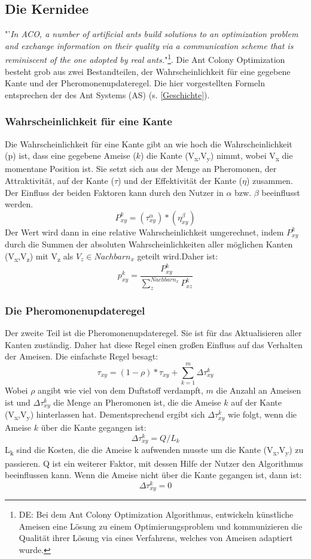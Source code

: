 \documentclass[12pt]{article}
\begin{document}
\subsection{Die Kernidee}\label{Kernidee}
"'\textit{In ACO, a number of artificial ants build solutions to an optimization problem and exchange information on their quality via a communication scheme that is reminiscent of the one adopted by real ants.}"\cite{ dorigo2007ant}\footnote{DE: Bei dem Ant Colony Optimization Algorithmus, entwickeln künstliche Ameisen eine Lösung zu einem Optimierungsproblem und kommunizieren die Qualität ihrer Lösung via eines Verfahrens, welches von Ameisen adaptiert wurde.  }. 
Die Ant Colony Optimization besteht grob aus zwei Bestandteilen, der Wahrscheinlichkeit für eine gegebene Kante und der Pheromonenupdateregel. Die hier vorgestellten Formeln entsprechen der des Ant Systems (AS) (s. \ref{Geschichte}).
\subsubsection{Wahrscheinlichkeit für eine Kante}\label{P/p}
Die Wahrscheinlichkeit für eine Kante gibt an wie hoch die Wahrscheinlichkeit (p) ist, dass eine gegebene Ameise ($k$) die Kante (V\textsubscript{x},V\textsubscript{y}) nimmt, wobei V\textsubscript{x} die momentane Position ist. Sie setzt sich aus der Menge an Pheromonen, der Attraktivität,  auf der Kante ($\tau$) und der Effektivität der Kante ($\eta$) zusammen. Der Einfluss der beiden Faktoren kann durch den Nutzer in $\alpha$ bzw. $\beta$ beeinflusst werden. \[ P ^{ k }_{ xy }=\left(  \tau ^{ \alpha }_{ xy } \right)*\left(  \eta ^{ \beta }_{ xy } \right)\]
Der Wert wird dann in eine relative Wahrscheinlichkeit umgerechnet, indem $P^k_{xy}$ durch die Summen der absoluten Wahrscheinlichkeiten aller möglichen Kanten (V\textsubscript{x},V\textsubscript{z}) mit V\textsubscript{z} als $V_z \in Nachbarn_{x}$ geteilt wird.Daher ist: \[p^{k}_{xy}=\frac{P^k_{xy}}{\sum_{z}^{Nachbarn_{x}}{P^{k }_{xz}}} \]
\subsubsection{Die Pheromonenupdateregel}
Der zweite Teil ist die Pheromonenupdateregel. Sie ist für das Aktualisieren aller Kanten zuständig. Daher hat diese Regel einen großen Einfluss auf das Verhalten der Ameisen. Die einfachste Regel besagt: \[\tau_{xy}= (1-\rho)*\tau_{xy}+\sum_{k=1}^{m}{ \Delta\tau^k_{xy}} \]
Wobei $\rho$ angibt wie viel von dem Duftstoff verdampft, $m$ die Anzahl an Ameisen ist und $\Delta\tau^k_{xy}$ die Menge an Pheromonen ist, die die Ameise $k$ auf der Kante (V\textsubscript{x},V\textsubscript{y}) hinterlassen hat. Dementsprechend ergibt sich $\Delta\tau^k_{xy}$ wie folgt, wenn die Ameise $k$ über die Kante gegangen ist:\[\Delta\tau^k_{xy}=Q/L_k\] L\textsubscript{k} sind die Kosten, die die Ameise k aufwenden musste um die Kante (V\textsubscript{x},V\textsubscript{y}) zu passieren. Q ist ein weiterer Faktor, mit dessen Hilfe der Nutzer den Algorithmus beeinflussen kann. Wenn die Ameise nicht über die Kante gegangen ist, dann ist: \[\Delta\tau^k_{xy}=0\]
\pagebreak
\end{document}
